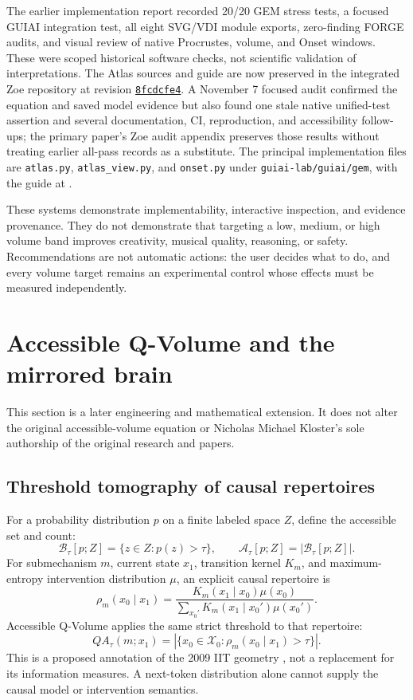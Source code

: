 \documentclass[11pt,a4paper]{article}
\begin{document}
The earlier implementation report recorded 20/20 GEM stress tests, a focused GUIAI integration test, all eight SVG/VDI module exports, zero-finding FORGE audits, and visual review of native Procrustes, volume, and Onset windows. These were scoped historical software checks, not scientific validation of interpretations. The Atlas sources and guide are now preserved in the integrated Zoe repository at revision \href{https://github.com/Ablation-Tool/zoe/commit/8fcdcfe49959761f87c746e808c168a1100a9707}{\texttt{8fcdcfe4}}. A November 7 focused audit confirmed the equation and saved model evidence but also found one stale native unified-test assertion and several documentation, CI, reproduction, and accessibility follow-ups; the primary paper's Zoe audit appendix preserves those results without treating earlier all-pass records as a substitute. The principal implementation files are \texttt{atlas.py}, \texttt{atlas\_view.py}, and \texttt{onset.py} under \texttt{guiai-lab/guiai/gem}, with the guide at .

These systems demonstrate implementability, interactive inspection, and evidence provenance. They do not demonstrate that targeting a low, medium, or high volume band improves creativity, musical quality, reasoning, or safety. Recommendations are not automatic actions: the user decides what to do, and every volume target remains an experimental control whose effects must be measured independently.

\section{Accessible Q-Volume and the mirrored brain}
This section is a later engineering and mathematical extension. It does not alter the original accessible-volume equation or Nicholas Michael Kloster's sole authorship of the original research and papers.

\subsection{Threshold tomography of causal repertoires}
For a probability distribution $p$ on a finite labeled space $Z$, define the accessible set and count:
\begin{equation}
\mathcal B_\tau[p;Z]=\{z\in Z:p(z)>\tau\},\qquad
\mathcal A_\tau[p;Z]=|\mathcal B_\tau[p;Z]|.
\end{equation}
For submechanism $m$, current state $x_1$, transition kernel $K_m$, and maximum-entropy intervention distribution $\mu$, an explicit causal repertoire is
\begin{equation}
\rho_m(x_0\mid x_1)=\frac{K_m(x_1\mid x_0)\mu(x_0)}{\sum_{x_0'}K_m(x_1\mid x_0')\mu(x_0')}.
\end{equation}
Accessible Q-Volume applies the same strict threshold to that repertoire:
\begin{equation}
QA_\tau(m;x_1)=|\{x_0\in\mathcal X_0:\rho_m(x_0\mid x_1)>\tau\}|.
\end{equation}
This is a proposed annotation of the 2009 IIT geometry \cite{iit2009}, not a replacement for its information measures. A next-token distribution alone cannot supply the causal model or intervention semantics.
\end{document}
